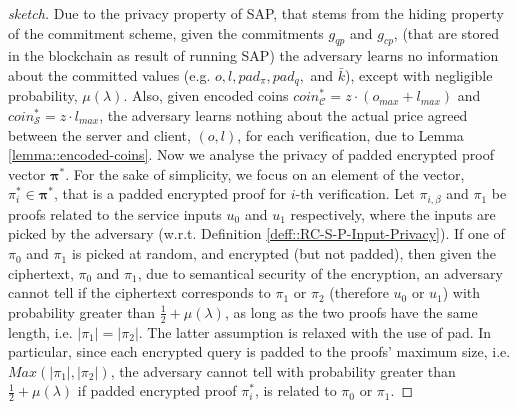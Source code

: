 \begin{proof}[sketch]
Due to the privacy property of SAP, that stems from the  hiding property of the commitment scheme, given the commitments $g_{\scriptscriptstyle qp}$ and $g_{\scriptscriptstyle cp}$, (that are stored in the blockchain as result of running SAP) the adversary learns no information about the committed values (e.g. $o, l, pad_{\scriptscriptstyle\pi}, pad_{\scriptscriptstyle q},$ and $\bar{k}$), except with negligible probability, $\mu(\lambda)$.   Also, given encoded coins $coin^{\scriptscriptstyle *}_{\scriptscriptstyle\mathcal{C}}=z\cdot (o_{\scriptscriptstyle max}+l_{\scriptscriptstyle max})$ and  $coin^{\scriptscriptstyle *}_{\scriptscriptstyle\mathcal{S}}=z\cdot l_{\scriptscriptstyle max}$, the adversary learns nothing about the actual price agreed between the server and client,  $(o,l)$, for each verification, due to Lemma \ref{lemma::encoded-coins}. Now we analyse the privacy of padded encrypted proof vector $\bm{\pi}^{\scriptscriptstyle *}$. For the sake of simplicity, we focus on an element of the vector,  $\pi_{\scriptscriptstyle i}^{\scriptscriptstyle *}\in\bm{\pi}^{\scriptscriptstyle *}$, that is a padded encrypted proof for $i$-th verification. Let $\pi_{\scriptscriptstyle i,\beta}$ and $\pi_{\scriptscriptstyle 1}$ be proofs related to the service inputs $u_{\scriptscriptstyle 0}$ and $u_{\scriptscriptstyle 1}$ respectively, where the inputs   are picked by the adversary (w.r.t. Definition  \ref{deff::RC-S-P-Input-Privacy}). If one of $\pi_{\scriptscriptstyle 0}$ and $\pi_{\scriptscriptstyle 1}$  is picked at random, and   encrypted (but not padded), then given the ciphertext, $\pi_{\scriptscriptstyle 0}$ and $\pi_{\scriptscriptstyle 1}$, due to semantical security of the encryption, an adversary cannot tell if the ciphertext corresponds to $\pi_{\scriptscriptstyle 1}$ or $\pi_{\scriptscriptstyle 2}$  (therefore $u_{\scriptscriptstyle 0}$ or $u_{\scriptscriptstyle 1}$) with probability greater than $\frac{1}{2}+\mu(\lambda)$,  as long as the two proofs have the same length, i.e. $|\pi_{\scriptscriptstyle 1}|=|\pi_{\scriptscriptstyle 2}|$.  The latter assumption is  relaxed with the use of pad. In particular, since each encrypted query is padded  to the proofs' maximum size, i.e. $Max(|\pi_{\scriptscriptstyle 1}|,|\pi_{\scriptscriptstyle 2}|)$, the adversary cannot tell with probability greater than $\frac{1}{2}+\mu(\lambda)$ if  padded encrypted proof $\pi_{\scriptscriptstyle i}^{\scriptscriptstyle *}$, is related to $\pi_{\scriptscriptstyle 0}$ or $\pi_{\scriptscriptstyle 1}$. 











\end{proof}
